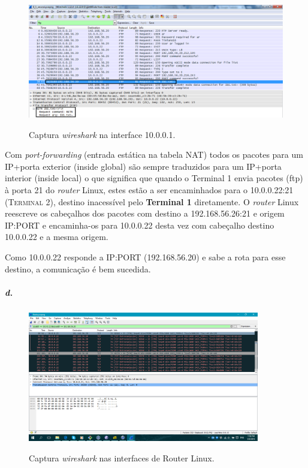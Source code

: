 \begin{figure}[h]
\centering
\includegraphics[width=1\textwidth, height=0.3\textheight]{5_b-enp1s6.png}
\label{fig:enp1s6}
\caption{Captura \emph{wireshark} na interface \textsf{10.0.0.1}.}
\end{figure}

Com \emph{port-forwarding} (entrada estática na tabela NAT) todos os
pacotes para um IP+porta exterior (inside global) são sempre
traduzidos para um IP+porta interior (inside local) o que significa
que quando o \textsf{Terminal 1} envia pacotes (ftp) à porta 21 do 
\textsf{\emph{router} Linux}, estes estão a ser encaminhados para o \textsf{10.0.0.22:21} (\textsc{Terminal 2}), destino inacessível pelo 
\textbf{Terminal 1} diretamente. O \textsf{\emph{router} Linux} 
reescreve os cabeçalhos dos pacotes com destino a \textsf{192.168.56.26:21} 
e origem \textsf{IP:PORT} e encaminha-os para \textsf{10.0.0.22} 
desta vez com cabeçalho destino \textsf{10.0.0.22} e a mesma origem.


Como \textsf{10.0.0.22} responde a \textsf{IP:PORT} (\textsf{192.168.56.20}) 
e sabe a rota para esse destino, a comunicação é bem sucedida.


\subparagraph{d.}

\begin{figure}[h]
\centering
\includegraphics[width=0.9\textwidth, height=0.3\textheight]{5d.png}
\label{fig:5d}
\caption{Captura \emph{wireshark} nas interfaces de \textsf{Router Linux}.}
\end{figure}

